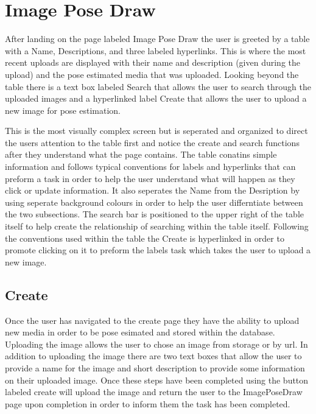 \documentclass{scrreprt}
\begin{document}
\section{Image Pose Draw}
After landing on the page labeled Image Pose Draw the user is greeted by a table with a Name, Descriptions, and three labeled hyperlinks. This is where the most recent uploads are displayed with their name and description (given during the upload) and the pose estimated media that was uploaded. Looking beyond the table there is a text box labeled Search that allows the user to search through the uploaded images and a hyperlinked label Create that allows the user to upload a new image for pose estimation.

This is the most visually complex screen but is seperated and organized to direct the users attention to the table first and notice the create and search functions after they understand what the page contains. The table conatins simple information and follows typical conventions for labels and hyperlinks that can preform a task in order to help the user understand what will happen as they click or update information. It also seperates the Name from the Desription by using seperate background colours in order to help the user differntiate between the two subsections. The search bar is positioned to the upper right of the table itself to help create the relationship of searching within the table itself. Following the conventions used within the table the Create is hyperlinked in order to promote clicking on it to preform the labels task which takes the user to upload a new image.

\subsection{Create}
Once the user has navigated to the create page they have the ability to upload new media in order to be pose esimated and stored within the database. Uploading the image allows the user to chose an image from storage or by url. In addition to uploading the image there are two text boxes that allow the user to provide a name for the image and short description to provide some information on their uploaded image. Once these steps have been completed using the button labeled create will upload the image and return the user to the ImagePoseDraw page upon completion in order to inform them the task has been completed.
\end{document}
